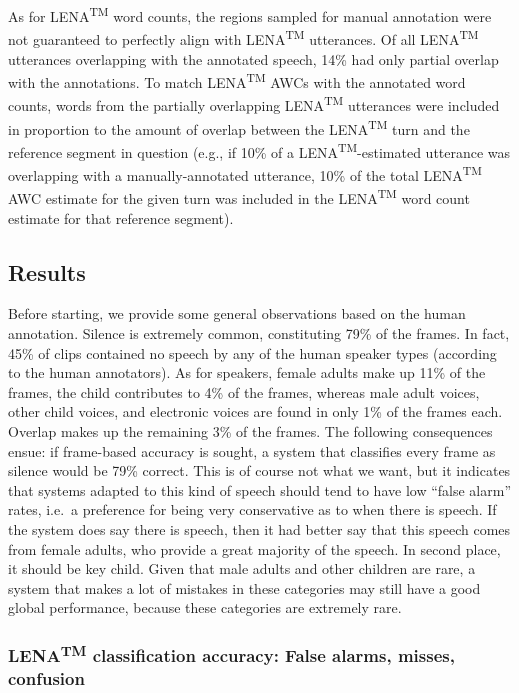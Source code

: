 \documentclass[english,floatsintext,man]{apa6}
\begin{document}
As for LENA\textsuperscript{TM} word counts, the regions sampled for
manual annotation were not guaranteed to perfectly align with
LENA\textsuperscript{TM} utterances. Of all LENA\textsuperscript{TM}
utterances overlapping with the annotated speech, 14\% had only partial
overlap with the annotations. To match LENA\textsuperscript{TM} AWCs
with the annotated word counts, words from the partially overlapping
LENA\textsuperscript{TM} utterances were included in proportion to the
amount of overlap between the LENA\textsuperscript{TM} turn and the
reference segment in question (e.g., if 10\% of a
LENA\textsuperscript{TM}-estimated utterance was overlapping with a
manually-annotated utterance, 10\% of the total LENA\textsuperscript{TM}
AWC estimate for the given turn was included in the
LENA\textsuperscript{TM} word count estimate for that reference
segment).

\subsection{Results}\label{results}

Before starting, we provide some general observations based on the human
annotation. Silence is extremely common, constituting 79\% of the
frames. In fact, 45\% of clips contained no speech by any of the human
speaker types (according to the human annotators). As for speakers,
female adults make up 11\% of the frames, the child contributes to 4\%
of the frames, whereas male adult voices, other child voices, and
electronic voices are found in only 1\% of the frames each. Overlap
makes up the remaining 3\% of the frames. The following consequences
ensue: if frame-based accuracy is sought, a system that classifies every
frame as silence would be 79\% correct. This is of course not what we
want, but it indicates that systems adapted to this kind of speech
should tend to have low \enquote{false alarm} rates, i.e.~a preference
for being very conservative as to when there is speech. If the system
does say there is speech, then it had better say that this speech comes
from female adults, who provide a great majority of the speech. In
second place, it should be key child. Given that male adults and other
children are rare, a system that makes a lot of mistakes in these
categories may still have a good global performance, because these
categories are extremely rare.

\subsubsection{\texorpdfstring{LENA\textsuperscript{TM} classification
accuracy: False alarms, misses,
confusion}{LENATM classification accuracy: False alarms, misses, confusion}}\label{lenatm-classification-accuracy-false-alarms-misses-confusion}
\end{document}
